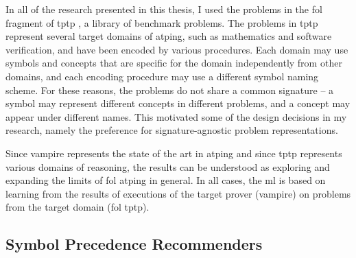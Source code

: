 In all of the research presented in this thesis, I used the problems in the \gls{fol} fragment of \gls{tptp} \cite{Sutcliffe2017}, a library of benchmark problems.
The problems in \gls{tptp} represent several target domains of \gls{atping},
such as mathematics and software verification, and have been encoded by various procedures.
Each domain may use symbols and concepts that are specific for the domain independently from other domains,
and each encoding procedure may use a different symbol naming scheme.
For these reasons, the problems do not share a common \gls{signature} -- a symbol may represent different concepts in different problems, and a concept may appear under different names.
This motivated some of the design decisions in my research, namely the preference for signature-agnostic problem representations.

Since \gls{vampire} represents the state of the art in \gls{atping} \cite{casc-j12,DBLP:journals/aicom/SutcliffeD23}
and since \gls{tptp} represents various domains of reasoning,
the results can be understood as exploring and expanding the limits of \gls{fol} \gls{atping} in general.
In all cases, the \gls{ml} is based on learning from the results of executions of the target prover (\gls{vampire}) on problems from the target domain (\gls{fol} \gls{tptp}).

\subsection{Symbol Precedence Recommenders}
\label{sec:contrib:SymbolPrecedenceRecommenders}

